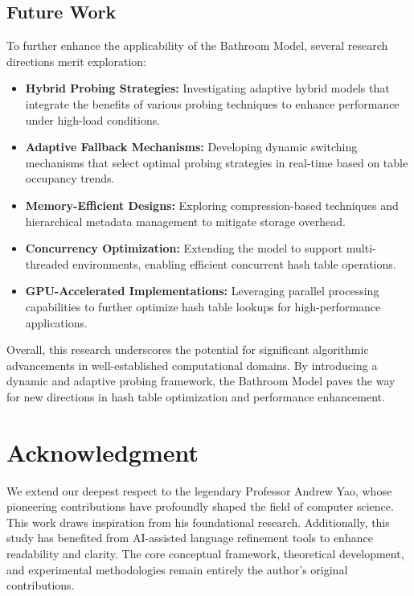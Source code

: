 \documentclass[letterpaper]{article}
\begin{document}
\subsection{Future Work}
To further enhance the applicability of the Bathroom Model, several research directions merit exploration:
\begin{itemize}
    \item \textbf{Hybrid Probing Strategies:} Investigating adaptive hybrid models that integrate the benefits of various probing techniques to enhance performance under high-load conditions.
    \item \textbf{Adaptive Fallback Mechanisms:} Developing dynamic switching mechanisms that select optimal probing strategies in real-time based on table occupancy trends.
    \item \textbf{Memory-Efficient Designs:} Exploring compression-based techniques and hierarchical metadata management to mitigate storage overhead.
    \item \textbf{Concurrency Optimization:} Extending the model to support multi-threaded environments, enabling efficient concurrent hash table operations.
    \item \textbf{GPU-Accelerated Implementations:} Leveraging parallel processing capabilities to further optimize hash table lookups for high-performance applications.
\end{itemize}

Overall, this research underscores the potential for significant algorithmic advancements in well-established computational domains. By introducing a dynamic and adaptive probing framework, the Bathroom Model paves the way for new directions in hash table optimization and performance enhancement.

\section*{Acknowledgment}
We extend our deepest respect to the legendary Professor Andrew Yao, whose pioneering contributions have profoundly shaped the field of computer science. This work draws inspiration from his foundational research.
Additionally, this study has benefited from AI-assisted language refinement tools to enhance readability and clarity. The core conceptual framework, theoretical development, and experimental methodologies remain entirely the author's original contributions.
\end{document}
